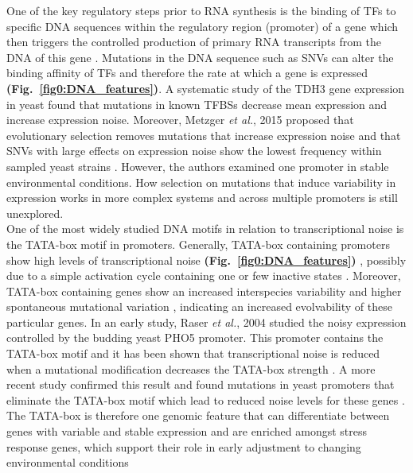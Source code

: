 One of the key regulatory steps prior to RNA synthesis is the binding of \glspl{TF} to specific DNA sequences within the regulatory region (promoter) of a gene which then triggers the controlled production of primary RNA transcripts from the DNA of this gene \citep{Latchman1997}. 
Mutations in the DNA sequence such as \glspl{SNV} can alter the binding affinity of TFs and therefore the rate at which a gene is expressed \textbf{(Fig.~\ref{fig0:DNA_features})}. 
A systematic study of the \gls{TDH3} gene expression in yeast found that mutations in known \glspl{TFBS} decrease mean expression and increase expression noise. 
Moreover, Metzger \textit{et al.}, 2015 proposed that evolutionary selection removes mutations that increase expression noise and that SNVs with large effects on expression noise show the lowest frequency within sampled yeast strains \citep{Metzger2015}. 
However, the authors examined one promoter in stable environmental conditions. 
How selection on mutations that induce variability in expression works in more complex systems and across multiple promoters is still unexplored.\\

One of the most widely studied DNA motifs in relation to transcriptional noise is the TATA-box motif in promoters. 
Generally, TATA-box containing promoters show high levels of transcriptional noise \textbf{(Fig.~\ref{fig0:DNA_features})} \citep{Faure2017}, possibly due to a simple activation cycle containing one or few inactive states \citep{Zoller2015}. 
Moreover, TATA-box containing genes show an increased interspecies variability \citep{Tirosh2006} and higher spontaneous mutational variation \citep{Landry2007}, indicating an increased evolvability of these particular genes. 
In an early study, Raser \textit{et al.}, 2004 studied the noisy expression controlled by the budding yeast \gls{PHO5} promoter. 
This promoter contains the TATA-box motif and it has been shown that transcriptional noise is reduced when a mutational modification decreases the TATA-box strength \citep{Raser2004}. 
A more recent study confirmed this result and found mutations in yeast promoters that eliminate the TATA-box motif which lead to reduced noise levels for these genes \citep{Hornung2012}. 
The TATA-box is therefore one genomic feature that can differentiate between genes with variable and stable expression and are enriched amongst stress response genes, which support their role in early adjustment to changing environmental conditions \citep{Lopez-Maury2009}\\

